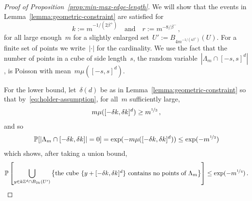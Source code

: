 \documentclass[12pt]{amsart}
\numberwithin{equation}{section}
\renewcommand*{\P}{\mathbb P}
\newcommand*{\Zd}{\ensuremath{\mathbb{Z}^d}}
\begin{document}
\begin{proof}[Proof of Proposition~\ref{prop:min-max-edge-length}]
	We will show that the events in Lemma~\ref{lemma:geometric-constraint} are satisfied for
	\begin{equation}
		\label{eq:choice-of-k-and-r}
	k :=  m^{-1/(2 \beta^{+})} \quad \mbox{and} \quad  r:= m^{-8/\beta^-} \, , 
	\end{equation}
	for all large enough~$m$ for a slightly enlarged set~$U' := B_{4 m^{-1/(4\beta^+)}}(U)$.  For a finite set of points we write~$|\cdot|$ for the cardinality.  We use the fact that the number of points in a cube of side length~$s$, the random variable~$|\Lambda_m \cap [-s,s]^d|$, is Poisson with mean~$m \mu([-s,s]^d)$. 

	For the lower bound, let~$\delta(d)$ be as in Lemma~\ref{lemma:geometric-constraint} so that by~\eqref{eq:holder-assumption}, 
	for all~$m$ sufficiently large, 
	\[
	m \mu([-\delta k,\delta k]^d) \geq  m^{\nicefrac13} \, , 
	\]
	and so
	\[
	\P[|\Lambda_m \cap [-\delta k,\delta k]| = 0] = \exp(-m \mu([-\delta k,\delta k]^d)) \leq \exp(-m^{\nicefrac13})
	\]
	which shows, after taking a union bound,
	\begin{equation}
		\label{eq:lower-bound-cube}
		\P\left[ \bigcup_{y \in k \Zd \cap B_{2 k}(U')} \left\{ \mbox{the cube~$\{y +[-\delta k,\delta k]^d\}$ contains no points of~$\Lambda_m$}\right\} \right] \leq \exp(-m^{\nicefrac14}) \, .
	\end{equation}

	
	

\end{proof}
\end{document}
